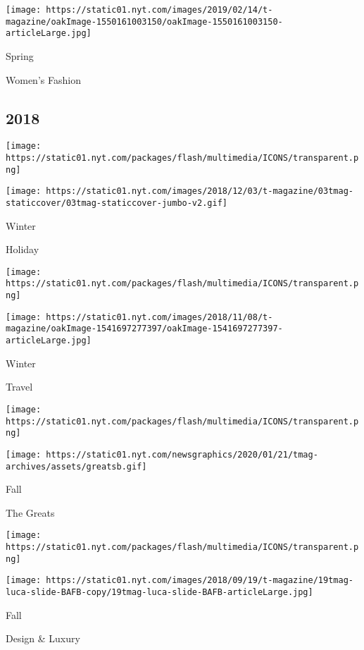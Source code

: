 \texttt{[image: https://static01.nyt.com/images/2019/02/14/t-magazine/oakImage-1550161003150/oakImage-1550161003150-articleLarge.jpg]}

Spring

Women's Fashion

\hypertarget{2018}{%
\subsection{2018}\label{2018}}

\href{https://www.nytimes.com/issue/t-magazine/2018/11/19/ts-dec-2-holiday-issue}{}

\texttt{[image: https://static01.nyt.com/packages/flash/multimedia/ICONS/transparent.png]}

\texttt{[image: https://static01.nyt.com/images/2018/12/03/t-magazine/03tmag-staticcover/03tmag-staticcover-jumbo-v2.gif]}

Winter

Holiday

\href{https://www.nytimes.com/issue/t-magazine/2018/10/26/ts-nov-11-travel-issue}{}

\texttt{[image: https://static01.nyt.com/packages/flash/multimedia/ICONS/transparent.png]}

\texttt{[image: https://static01.nyt.com/images/2018/11/08/t-magazine/oakImage-1541697277397/oakImage-1541697277397-articleLarge.jpg]}

Winter

Travel

\href{https://www.nytimes.com/issue/t-magazine/2018/10/05/ts-oct-21-greats-issue}{}

\texttt{[image: https://static01.nyt.com/packages/flash/multimedia/ICONS/transparent.png]}

\texttt{[image: https://static01.nyt.com/newsgraphics/2020/01/21/tmag-archives/assets/greatsb.gif]}

Fall

The Greats

\href{https://www.nytimes.com/issue/t-magazine/2018/09/06/ts-sept-23-design-luxury-issue}{}

\texttt{[image: https://static01.nyt.com/packages/flash/multimedia/ICONS/transparent.png]}

\texttt{[image: https://static01.nyt.com/images/2018/09/19/t-magazine/19tmag-luca-slide-BAFB-copy/19tmag-luca-slide-BAFB-articleLarge.jpg]}

Fall

Design \& Luxury

